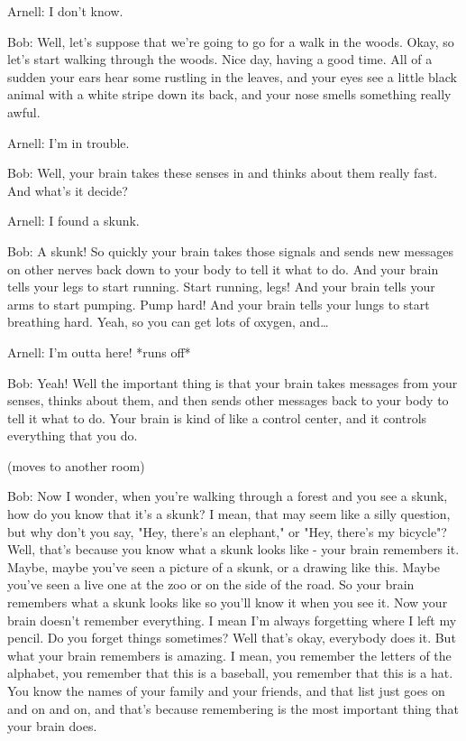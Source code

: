 Arnell: I don't know.

Bob: Well, let's suppose that we're going to go for a walk in the woods. Okay, so let's start walking through the woods. Nice day, having a good time. All of a sudden your ears hear some rustling in the leaves, and your eyes see a little black animal with a white stripe down its back, and your nose smells something really awful.

Arnell: I'm in trouble.

Bob: Well, your brain takes these senses in and thinks about them really fast. And what's it decide?

Arnell: I found a skunk.

Bob: A skunk! So quickly your brain takes those signals and sends new messages on other nerves back down to your body to tell it what to do. And your brain tells your legs to start running. Start running, legs! And your brain tells your arms to start pumping. Pump hard! And your brain tells your lungs to start breathing hard. Yeah, so you can get lots of oxygen, and\dots

Arnell: I'm outta here! *runs off*

Bob: Yeah! Well the important thing is that your brain takes messages from your senses, thinks about them, and then sends other messages back to your body to tell it what to do. Your brain is kind of like a control center, and it controls everything that you do.

(moves to another room)

Bob: Now I wonder, when you're walking through a forest and you see a skunk, how do you know that it's a skunk? I mean, that may seem like a silly question, but why don't you say, "Hey, there's an elephant," or "Hey, there's my bicycle"? Well, that's because you know what a skunk looks like - your brain remembers it. Maybe, maybe you've seen a picture of a skunk, or a drawing like this. Maybe you've seen a live one at the zoo or on the side of the road. So your brain remembers what a skunk looks like so you'll know it when you see it. Now your brain doesn't remember everything. I mean I'm always forgetting where I left my pencil. Do you forget things sometimes? Well that's okay, everybody does it. But what your brain remembers is amazing. I mean, you remember the letters of the alphabet, you remember that this is a baseball, you remember that this is a hat. You know the names of your family and your friends, and that list just goes on and on and on, and that's because remembering is the most important thing that your brain does.


